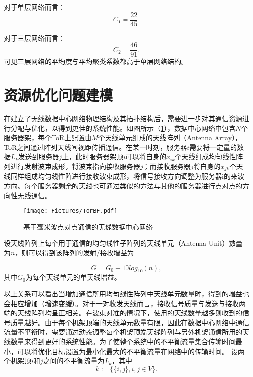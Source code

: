 对于单层网络而言：
\begin{equation}
	C_1 = \frac{22}{45}.
\end{equation}

对于三层网络而言：
\begin{equation}
	C_2 = \frac{46}{91}.
\end{equation}
可见三层网络的平均度与平均聚类系数都高于单层网络结构。

\section{资源优化问题建模}

在建立了无线数据中心网络物理结构及其拓扑结构后，需要进一步对其通信资源进行分配与优化，以得到更佳的系统性能。如图所示（\ref{fig:TorBF}），数据中心网络中包含$N$个服务器架，每个ToR上配置由$M$个天线单元组成的天线阵列（Antenna Array），ToR之间通过阵列天线间视距传播通信。在某一时刻，服务器$i$需要将一定量的数据$L_{k}$发送到服务器$j$上，此时服务器架顶$i$可以将自身的$x_{ik}$个天线组成均匀线性阵列进行发射波束成形，将波束指向接收服务器$j$；而接收服务器$j$将自身的$x_{jk}$个天线同样组成均匀线性阵进行接收波束成形，将信号接收方向调整为服务器i的来波方向。每个服务器剩余的天线也可通过类似的方法与其他的服务器进行点对点的方向性无线通信。

\begin{figure}[htbp]
	\centering
	\texttt{[image: Pictures/TorBF.pdf]}
	\caption{基于毫米波点对点通信的无线数据中心网络}
	\label{fig:TorBF}
\end{figure}

设天线阵列上每个用于通信的均匀线性子阵列的天线单元（Antenna Unit）数量为$n$，则可以得到该阵列的发射/接收增益为

\begin{equation}
G = G_0 + 10log_{10}(n),
\end{equation}
其中$G_0$为每个天线单元的单天线增益\cite{vardhan201460}。

以上关系可以看出当增加通信所用均匀线性阵列中天线单元数量时，得到的增益也会相应增加（增速变缓）。对于一对收发天线而言，接收信号质量与发送与接收两端的天线阵列均呈正相关。在波束对准的情况下，使用的天线数量越多则收到的信号质量越好。由于每个机架顶端的天线单元数量有限，因此在数据中心网络中通信流量不平衡时，需要通过动态调整每个机架顶端天线阵列与另外机架通信所用的天线数量来得到更好的系统性能。为了使整个系统中的不平衡流量集合传输时间最小，可以将优化目标设置为最小化最大的不平衡流量在网络中的传输时间。
设两个机架顶$i$和$j$之间的不平衡流量为$L_{k}$，其中
\begin{equation}
k := \big\{\{i,j\},i,j\in V\big\}.
\end{equation}

